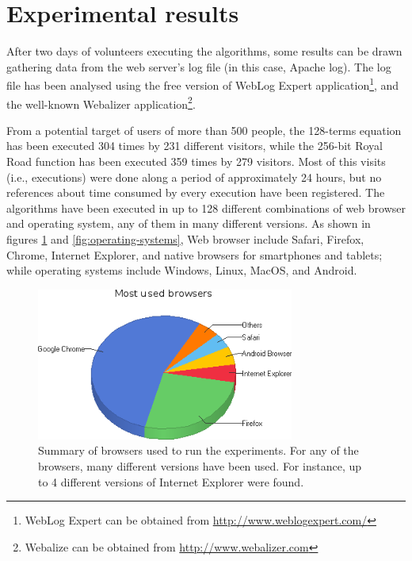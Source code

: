 \documentclass[runningheads,a4paper]{llncs}
\begin{document}
  	




\section{Experimental results}
\label{sec:exp}

After two days of volunteers executing the algorithms, some results can be drawn gathering data from the web server's log file (in this case, Apache log). The log file has been analysed using the free version of WebLog Expert application\footnote{WebLog Expert can be obtained from \url{http://www.weblogexpert.com/}}, and the well-known Webalizer application\footnote{Webalize can be obtained from \url{http://www.webalizer.com}}.

From a potential target of users of more than 500 people, the 128-terms equation has been executed 304 times by 231 different visitors, while the 256-bit Royal Road function has been executed 359 times by 279 visitors. Most of this visits (i.e., executions) were done along a period of approximately 24 hours, but no references about time consumed by every execution have been registered. The algorithms have been executed in up to 128 different combinations of web browser and operating system, any of them in many different versions. As shown in figures \ref{fig:browsers} and \ref{fig:operating-systems}, Web browser include Safari, Firefox, Chrome, Internet Explorer, and native browsers for smartphones and tablets; while operating systems include Windows, Linux, MacOS, and Android.

\begin{figure}
\centering
\includegraphics[height=5cm]{Most_Used_Browsers}
\caption{Summary of browsers used to run the experiments. For any of the browsers, many different versions have been used. For instance, up to 4 different versions of Internet Explorer were found.}
\label{fig:browsers}
\end{figure}
\end{document}
